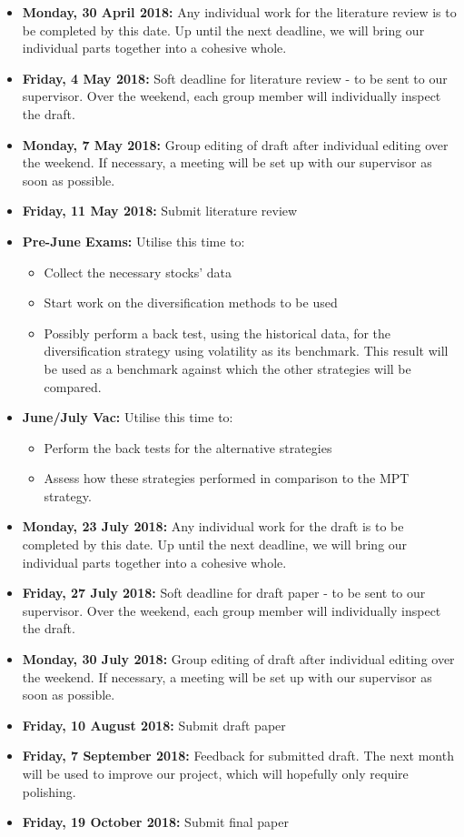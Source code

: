\documentclass[12pt,a4paper]{article}
\newcommand{\bi}{\begin{itemize}}
\newcommand{\ei}{\end{itemize}}
\begin{document}
\bi
\item \textbf{Monday, 30 April 2018:} Any individual work for the literature review is to be completed by this date. Up until the next deadline, we will bring our individual parts together into a cohesive whole.
\item \textbf{Friday, 4 May 2018:} Soft deadline for literature review - to be sent to our supervisor. Over the weekend, each group member will individually inspect the draft.
\item \textbf{Monday, 7 May 2018:} Group editing of draft after individual editing over the weekend. If necessary, a meeting will be set up with our supervisor as soon as possible.
\item \textbf{Friday, 11 May 2018:} Submit literature review
\item \textbf{Pre-June Exams:} Utilise this time to:
	\bi
	\item Collect the necessary stocks' data
	\item Start work on the diversification methods to be used
	\item Possibly perform a back test, using the historical data, for the diversification strategy using volatility as its benchmark. This result will be used as a benchmark against which the other strategies will be compared. 
	\ei
\item \textbf{June/July Vac:} Utilise this time to:
	\bi
	\item Perform the back tests for the alternative strategies
	\item Assess how these strategies performed in comparison to the MPT strategy.
	\ei
\item \textbf{Monday, 23 July 2018:} Any individual work for the draft is to be completed by this date. Up until the next deadline, we will bring our individual parts together into a cohesive whole.
\item \textbf{Friday, 27 July 2018:} Soft deadline for draft paper - to be sent to our supervisor. Over the weekend, each group member will individually inspect the draft.
\item \textbf{Monday, 30 July 2018:} Group editing of draft after individual editing over the weekend. If necessary, a meeting will be set up with our supervisor as soon as possible.
\item \textbf{Friday, 10 August 2018:} Submit draft paper 
\item \textbf{Friday, 7 September 2018:} Feedback for submitted draft. The next month will be used to improve our project, which will hopefully only require polishing.
\item \textbf{Friday, 19 October 2018:} Submit final paper 
\ei

\newpage


\label{bib:bibliography}
 
\end{document}
